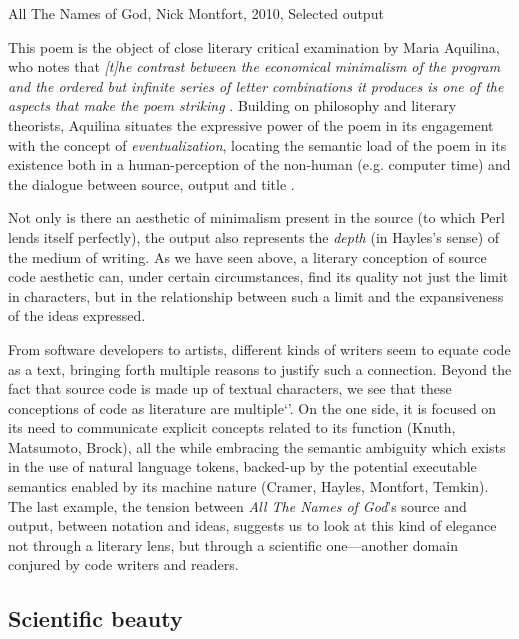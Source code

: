 \begin{listing}
  \inputminted[breaklines=true,breakanywhere]{text}{./corpus/all_the_names_of_god.txt}
  \caption{All The Names of God, Nick Montfort, 2010, Selected output}
  \label{code:all_the_outputs_of_god}
\end{listing}

This poem is the object of close literary critical examination by Maria Aquilina, who notes that \emph{[t]he contrast between the economical minimalism of the program and the ordered but infinite series of letter combinations it produces is one of the aspects that make the poem striking} \citep{aquilina_computational_2015}. Building on philosophy and literary theorists, Aquilina situates the expressive power of the poem in its engagement with the concept of \emph{eventualization}, locating the semantic load of the poem in its existence both in a human-perception of the non-human (e.g. computer time) and the dialogue between source, output and title \citep{aquilina_computational_2015}.

Not only is there an aesthetic of minimalism present in the source (to which Perl lends itself perfectly), the output also represents the \emph{depth} (in Hayles's sense) of the medium of writing. As we have seen above, a literary conception of source code aesthetic can, under certain circumstances, find its quality not just the limit in characters, but in the relationship between such a limit and the expansiveness of the ideas expressed.

From software developers to artists, different kinds of writers seem to equate code as a text, bringing forth multiple reasons to justify such a connection. Beyond the fact that source code is made up of textual characters, we see that these conceptions of code as literature are multiple`'. On the one side, it is focused on its need to communicate explicit concepts related to its function (Knuth, Matsumoto, Brock), all the while embracing the semantic ambiguity which exists in the use of natural language tokens, backed-up by the potential executable semantics enabled by its machine nature (Cramer, Hayles, Montfort, Temkin).
The last example, the tension between \emph{All The Names of God}'s source and output, between notation and ideas, suggests us to look at this kind of elegance not through a literary lens, but through a scientific one—another domain conjured by code writers and readers.

\subsection{Scientific beauty}
\label{subsec:scientific-beauty}

